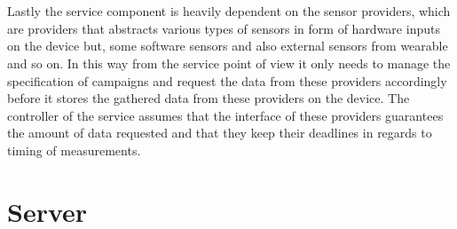 \\\\
Lastly the service component is heavily dependent on the sensor providers, which are providers that abstracts various types of sensors in form of hardware inputs on the device but, some software sensors and also external sensors from wearable and so on. In this way from the service point of view it only needs to manage the specification of campaigns and request the data from these providers accordingly before it stores the gathered data from these providers on the device. The controller of the service assumes that the interface of these providers guarantees the amount of data requested and that they keep their deadlines in regards to timing of measurements.

\section{Server}
